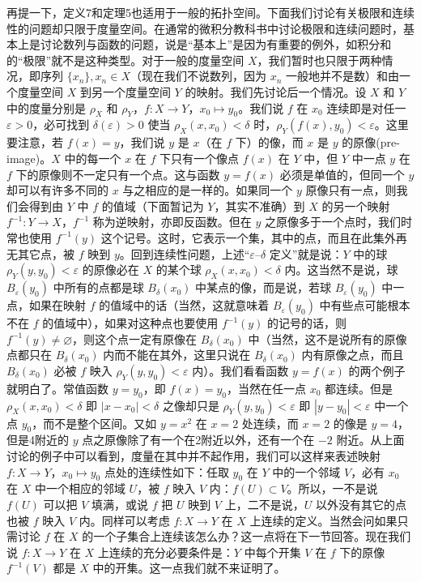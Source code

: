 再提一下，定义7和定理5也适用于一般的拓扑空间。下面我们讨论有关极限和连续性的问题却只限于度量空间。在通常的微积分教科书中讨论极限和连续问题时，基本上是讨论数列与函数的问题，说是“基本上”是因为有重要的例外，如积分和的“极限”就不是这种类型。对于一般的度量空间 $X$，我们暂时也只限于两种情况，即序列 $\{x_n\},x_n\in X$（现在我们不说数列，因为 $x_n$ 一般地并不是数）和由一个度量空间 $X$ 到另一个度量空间 $Y$ 的映射。我们先讨论后一个情况。设 $X$ 和 $Y$ 中的度量分别是 $\rho_X$ 和 $\rho_Y$，$f:X\to Y$，$x_0\mapsto y_0$。我们说 $f$ 在 $x_0$ 连续即是对任一 $\varepsilon>0$，必可找到 $\delta(\varepsilon)>0$ 使当 $\rho_X(x,x_0)<\delta$ 时，$\rho_Y(f(x),y_0)<\varepsilon$。这里要注意，若 $f(x)=y$，我们说 $y$ 是 $x$（在 $f$ 下）的像，而 $x$ 是 $y$ 的原像(pre-image)。$X$ 中的每一个 $x$ 在 $f$ 下只有一个像点 $f(x)$ 在 $Y$ 中，但 $Y$ 中一点 $y$ 在 $f$ 下的原像则不一定只有一个点。这与函数 $y=f(x)$ 必须是单值的，但同一个 $y$ 却可以有许多不同的 $x$ 与之相应的是一样的。如果同一个 $y$ 原像只有一点，则我们会得到由 $Y$ 中 $f$ 的值域（下面暂记为 $Y$，其实不准确）到 $X$ 的另一个映射 $f^{-1}:Y\to X$，$f^{-1}$ 称为逆映射，亦即反函数。但在 $y$ 之原像多于一个点时，我们时常也使用 $f^{-1}(y)$ 这个记号。这时，它表示一个集，其中的点，而且在此集外再无其它点，被 $f$ 映到 $y$。回到连续性问题，上述“$\varepsilon$--$\delta$ 定义”就是说：$Y$ 中的球 $\rho_Y(y,y_0)<\varepsilon$ 的原像必在 $X$ 的某个球 $\rho_X(x,x_0)<\delta$ 内。这当然不是说，球 $B_\varepsilon(y_0)$ 中所有的点都是球 $B_\delta(x_0)$ 中某点的像，而是说，若球 $B_\varepsilon(y_0)$ 中一点，如果在映射 $f$ 的值域中的话（当然，这就意味着 $B_\varepsilon(y_0)$ 中有些点可能根本不在 $f$ 的值域中），如果对这种点也要使用 $f^{-1}(y)$ 的记号的话，则 $f^{-1}(y)\ne\varnothing$，则这个点一定有原像在 $B_\delta(x_0)$ 中（当然，这不是说所有的原像点都只在 $B_\delta(x_0)$ 内而不能在其外，这里只说在 $B_\delta(x_0)$ 内有原像之点，而且 $B_\delta(x_0)$ 必被 $f$ 映入 $\rho_Y(y,y_0)<\varepsilon$ 内）。我们看看函数 $y=f(x)$ 的两个例子就明白了。常值函数 $y=y_0$，即 $f(x)=y_0$，当然在任一点 $x_0$ 都连续。但是 $\rho_X(x,x_0)<\delta$ 即 $|x-x_0|<\delta$ 之像却只是 $\rho_Y(y,y_0)<\varepsilon$ 即 $|y-y_0|<\varepsilon$ 中一个点 $y_0$，而不是整个区间。又如 $y=x^2$ 在 $x=2$ 处连续，而 $x=2$ 的像是 $y=4$，但是4附近的 $y$ 点之原像除了有一个在2附近以外，还有一个在 $-2$ 附近。从上面讨论的例子中可以看到，度量在其中并不起作用，我们可以这样来表述映射 $f:X\to Y$，$x_0\mapsto y_0$ 点处的连续性如下：任取 $y_0$ 在 $Y$ 中的一个邻域 $V$，必有 $x_0$ 在 $X$ 中一个相应的邻域 $U$，被 $f$ 映入 $V$ 内：$f(U)\subset V$。所以，一不是说 $f(U)$ 可以把 $V$ 填满，或说 $f$ 把 $U$ 映到 $V$ 上，二不是说，$U$ 以外没有其它的点也被 $f$ 映入 $V$ 内。同样可以考虑 $f:X\to Y$ 在 $X$ 上连续的定义。当然会问如果只需讨论 $f$ 在 $X$ 的一个子集合上连续该怎么办？这一点将在下一节回答。现在我们说 $f:X\to Y$ 在 $X$ 上连续的充分必要条件是：$Y$ 中每个开集 $V$ 在 $f$ 下的原像 $f^{-1}(V)$ 都是 $X$ 中的开集。这一点我们就不来证明了。


